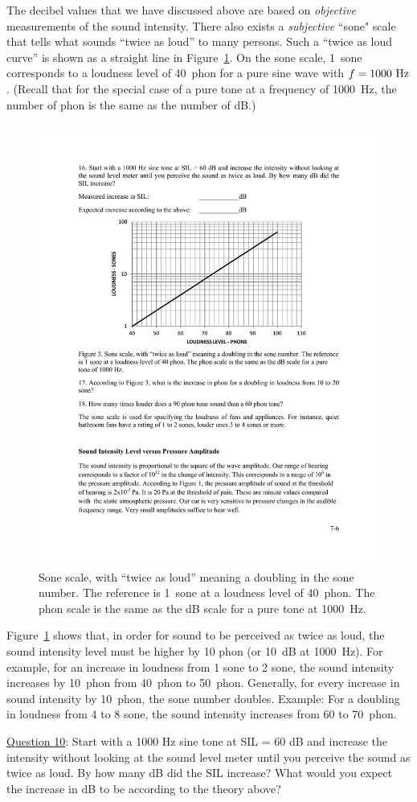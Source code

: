 \documentclass[11pt]{NSF}
\begin{document}
The decibel values that we have discussed above are based on 
{\em objective} measurements of the sound intensity. 
There also exists a {\em subjective} ``sone" scale that tells 
what sounds ``twice as loud” to many persons. 
Such a ``twice as loud curve” is shown as a straight line in 
Figure~\ref{f:3}. 
On the sone scale, 1~sone corresponds to a loudness level of 
40~phon for a pure sine wave with $f = 1000~{\rm Hz}$. 
(Recall that for the special case of a pure tone at a frequency 
of 1000~Hz, the number of phon is the same 
as the number of dB.)
%
\begin{figure}[hbtp]
\begin{center}
\includegraphics[width=.6\textwidth]{fig7_3}
\caption{Sone scale, with ``twice as loud” meaning a doubling in the
sone number. The reference is 1~sone at a loudness level of 40~phon.
The phon scale is the same as the dB scale for a pure tone at 1000~Hz.}
\label{f:3}
\end{center}
\end{figure}

Figure~\ref{f:3} shows that, in order for sound to be perceived as twice as
loud, the sound intensity level must be higher by 10 phon (or 10~dB at
1000~Hz).
For example, for an increase in loudness from 1 sone to 2 sone, the 
sound intensity increases by 10~phon from 40~phon to 50~phon. 
Generally, for every increase in sound intensity by 10~phon, the sone 
number doubles. 
Example: For a doubling in loudness from 4 to 8 sone, the sound intensity 
increases from 60 to 70~phon.

\underline{Question 10}: Start with a 1000 Hz sine tone at SIL = 60 dB and increase the intensity without looking at
the sound level meter until you perceive the sound as twice as loud. By how many dB did the
SIL increase? What would you expect the increase in dB to be according to the theory above?
\\
\\
\\
\end{document}
